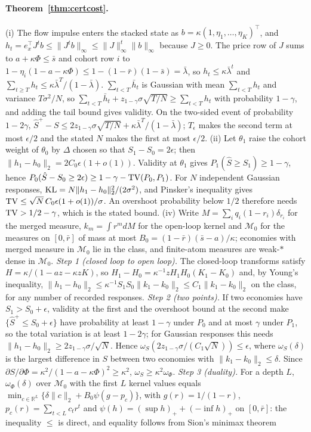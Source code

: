 \paragraph{Theorem~\ref{thm:certcost}.} (i) The flow impulse enters the stacked state as $b=\kappa(1,\eta_1,\ldots,\eta_K)^\top$, and $h_t=e_x^\top J^tb\le\|J^tb\|_\infty\le\|J\|_\infty^t\|b\|_\infty$ because $J\ge0$. The price row of $J$ sums to $a+\kappa\Phi\le\bar s$ and cohort row $i$ to $1-\eta_i(1-a-\kappa\Phi)\le1-(1-\bar r)(1-\bar s)=\bar\lambda$, so $h_t\le\kappa\bar\lambda^t$ and $\sum_{t\ge T}h_t\le\kappa\bar\lambda^T/(1-\bar\lambda)$. $\sum_{t<T}\bar h_t$ is Gaussian with mean $\sum_{t<T}h_t$ and variance $T\sigma^2/N$, so $\sum_{t<T}\bar h_t+z_{1-\gamma}\sigma\sqrt{T/N}\ge\sum_{t<T}h_t$ with probability $1-\gamma$, and adding the tail bound gives validity. On the two-sided event of probability $1-2\gamma$, $\hat S^+-S\le2z_{1-\gamma}\sigma\sqrt{T/N}+\kappa\bar\lambda^T/(1-\bar\lambda)$; $T_\epsilon$ makes the second term at most $\epsilon/2$ and the stated $N$ makes the first at most $\epsilon/2$. (ii) Let $\theta_1$ raise the cohort weight of $\theta_0$ by $\Delta$ chosen so that $S_1-S_0=2\epsilon$; then $\|h_1-h_0\|_2=2C_0\epsilon(1+o(1))$. Validity at $\theta_1$ gives $P_1(\hat S\ge S_1)\ge1-\gamma$, hence $P_0(\hat S-S_0\ge2\epsilon)\ge1-\gamma-{\rm TV}(P_0,P_1)$. For $N$ independent Gaussian responses, ${\rm KL}=N\|h_1-h_0\|_2^2/(2\sigma^2)$, and Pinsker's inequality gives ${\rm TV}\le\sqrt N\,C_0\epsilon(1+o(1))/\sigma$. An overshoot probability below $1/2$ therefore needs ${\rm TV}>1/2-\gamma$, which is the stated bound. (iv) Write $M=\sum_iq_i(1-r_i)\delta_{r_i}$ for the merged measure, $k_m=\int r^m dM$ for the open-loop kernel and $\mathcal M_0$ for the measures on $[0,\bar r]$ of mass at most $B_0=(1-\bar r)(\bar s-a)/\kappa$; economies with merged measure in $\mathcal M_0$ lie in the class, and finite-atom measures are weak-$*$ dense in $\mathcal M_0$. \emph{Step 1 (closed loop to open loop).} The closed-loop transforms satisfy $H=\kappa/(1-az-\kappa zK)$, so $H_1-H_0=\kappa^{-1}zH_1H_0(K_1-K_0)$ and, by Young's inequality, $\|h_1-h_0\|_2\le\kappa^{-1}S_1S_0\|k_1-k_0\|_2\le C_1\|k_1-k_0\|_2$ on the class, for any number of recorded responses. \emph{Step 2 (two points).} If two economies have $S_1>S_0+\epsilon$, validity at the first and the overshoot bound at the second make $\{\hat S^+\le S_0+\epsilon\}$ have probability at least $1-\gamma$ under $P_0$ and at most $\gamma$ under $P_1$, so the total variation is at least $1-2\gamma$; for Gaussian responses this needs $\|h_1-h_0\|_2\ge2z_{1-\gamma}\sigma/\sqrt N$. Hence $\omega_S(2z_{1-\gamma}\sigma/(C_1\sqrt N))\le\epsilon$, where $\omega_S(\delta)$ is the largest difference in $S$ between two economies with $\|k_1-k_0\|_2\le\delta$. Since $\partial S/\partial\Phi=\kappa^2/(1-a-\kappa\Phi)^2\ge\kappa^2$, $\omega_S\ge\kappa^2\omega_\Phi$. \emph{Step 3 (duality).} For a depth $L$, $\omega_\Phi(\delta)$ over $\mathcal M_0$ with the first $L$ kernel values equals $\min_{c\in\mathbb R^L}\{\delta\|c\|_2+B_0\psi(g-p_c)\}$, with $g(r)=1/(1-r)$, $p_c(r)=\sum_{t<L}c_tr^t$ and $\psi(h)=(\sup h)_++(-\inf h)_+$ on $[0,\bar r]$: the inequality $\le$ is direct, and equality follows from Sion's minimax theorem 